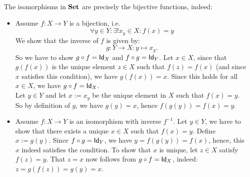 \begin{solution}\label{sol:iso_in_sets}
The isomorphisms in $\SET$ are precisely the bijective functions, indeed:
\begin{itemize}
\item Assume $f: X\to Y$ is a bijection, i.e.
\[
\forall y\in Y: \exists! x_{y}\in X: f(x)=y 
\]
We show that the inverse of $f$ is given by:
\[
g : Y\to X: y\mapsto x_y.
\]
So we have to show $\co{f}{g} = \Id[X]$ and $\co{g}{f} = \Id[Y]$. Let $x\in X$, since that $g(f(x))$ is the unique element $z\in X$ such that $f(z) = f(x)$ (and since $x$ satisfies this condition), we have $g(f(x)) = x$. Since this holds for all $x\in X$, we have $\co{f}{g} = \Id[X]$.\\
Let $y\in Y$ and let $x := x_y$  be the unique element in $X$ such that $f(x)=y$. So by definition of $g$, we have $g(y) = x$, hence 
$f(g(y)) = f(x) = y$.
\item Assume $f:X\to Y$ is an isomorphism with inverse $f^{-1}$. Let $y\in Y$, we have to show that there exists a unique $x\in X$ such that $f(x)=y$. Define $x := g(y)$. Since $\co{g}{f} = \Id[Y]$, we have $y = f(g(y)) = f(x)$, hence, this $x$ indeed satisfies the condition. To show that $x$ is unique, let $z\in X$ satisfy $f(z)=y$. That $z=x$ now follows from $\co{f}{g} = \Id[X]$, indeed: 
$z = g(f(z)) = g(y) = x$.
\end{itemize}
\end{solution}

